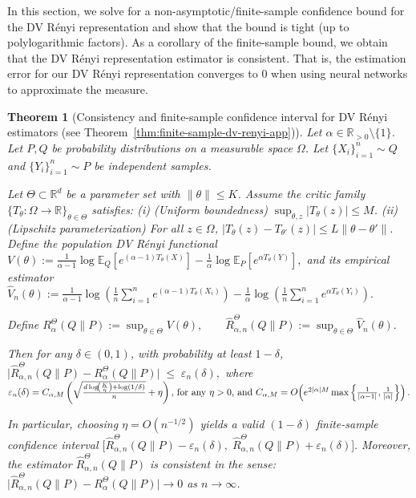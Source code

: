 \documentclass{article}
\theoremstyle{plain}
\newtheorem{theorem}{Theorem}[section]
\theoremstyle{definition}
\theoremstyle{remark}
\begin{document}
In this section, we solve for a non-asymptotic/finite-sample confidence bound for the DV R\'enyi representation and show that the bound is tight (up to polylogarithmic factors).
As a corollary of the finite-sample bound, we obtain that the DV R\'enyi representation
estimator is consistent. That is,
the estimation error for our DV R\'enyi representation converges to 0 when using neural networks to approximate the measure.

\begin{theorem}[Consistency and finite-sample confidence interval for DV R\'enyi estimators (see Theorem~\ref{thm:finite-sample-dv-renyi-app})]
\label{thm:finite-sample-dv-renyi}
Let $\alpha\in\mathbb{R}_{> 0}\setminus\{1\}$.  
Let $P,Q$ be probability distributions on a measurable space $\Omega$.
Let $\{X_i\}_{i=1}^n \sim Q$ and $\{Y_i\}_{i=1}^n \sim P$ be independent samples.

Let $\Theta \subset \mathbb{R}^d$ be a parameter set with $\|\theta\|\le K$.
Assume the critic family $\{T_\theta:\Omega\to\mathbb{R}\}_{\theta\in\Theta}$ satisfies:
(i) (\emph{Uniform boundedness}) $\sup_{\theta,z}|T_\theta(z)| \le M$.
(ii) (\emph{Lipschitz parameterization}) For all $z\in\Omega$,
\(
|T_\theta(z)-T_{\theta'}(z)| \le L \|\theta-\theta'\|.
\)
Define the population DV R\'enyi functional
\(
V(\theta)
:=\frac{1}{\alpha-1}\log \mathbb{E}_{Q}\!\left[e^{(\alpha-1)T_\theta(X)}\right]
-\frac{1}{\alpha}\log \mathbb{E}_{P}\!\left[e^{\alpha T_\theta(Y)}\right],
\)
and its empirical estimator
\(
\widehat V_n(\theta)
:=\frac{1}{\alpha-1}\log\!\left(\frac{1}{n}\sum_{i=1}^n e^{(\alpha-1)T_\theta(X_i)}\right)
-\frac{1}{\alpha}\log\!\left(\frac{1}{n}\sum_{i=1}^n e^{\alpha T_\theta(Y_i)}\right).
\)

Define
\(
R_\alpha^{\Theta}(Q\|P):=\sup_{\theta\in\Theta} V(\theta),
\qquad
\widehat R_{\alpha,n}^{\Theta}(Q\|P):=\sup_{\theta\in\Theta} \widehat V_n(\theta).
\)

Then for any $\delta\in(0,1)$, with probability at least $1-\delta$,
\(
\big|\widehat R_{\alpha,n}^{\Theta}(Q\|P)-R_\alpha^{\Theta}(Q\|P)\big|
\;\le\;
\varepsilon_n(\delta),
\)
where
\(
\varepsilon_n(\delta)
=
C_{\alpha,M}
\left(
\sqrt{\frac{d\log\!\left(\frac{K}{\eta}\right)+\log(1/\delta)}{n}}
+
\eta
\right),$
for any $\eta>0$, and
$C_{\alpha,M}
=
O\!\left(
e^{2|\alpha|M}\max\Big\{\tfrac{1}{|\alpha-1|},\tfrac{1}{|\alpha|}\Big\}
\right).
\)

In particular, choosing $\eta = O(n^{-1/2})$ yields a valid $(1-\delta)$
finite-sample confidence interval
\(
\Big[
\widehat R_{\alpha,n}^{\Theta}(Q\|P)-\varepsilon_n(\delta),
\;
\widehat R_{\alpha,n}^{\Theta}(Q\|P)+\varepsilon_n(\delta)
\Big].
\)
Moreover,
the estimator $\widehat R_{\alpha,n}^{\Theta}(Q\|P)$ is consistent in the sense:
$\big|\widehat R_{\alpha,n}^{\Theta}(Q\|P)-R_\alpha^{\Theta}(Q\|P)\big|\rightarrow 0$ as $n\rightarrow\infty$.
\end{theorem}
\end{document}
